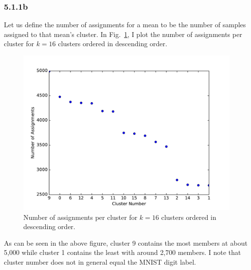 \documentclass[12pt]{amsart}
\begin{document}
\subsubsection*{5.1.1b}
Let us define the number of assignments for a mean to be the number of samples assigned to that mean's cluster.  In Fig.~\ref{fig:k_16_num_assignments}, I plot the number of assignments per cluster for $k = 16$ clusters ordered in descending order.
\begin{figure}[H]
	\includegraphics[width=\columnwidth]{k_16_num_assignments.pdf}
    \caption{Number of assignments per cluster for $k = 16$ clusters ordered in descending order.}
    \label{fig:k_16_num_assignments}
\end{figure}
As can be seen in the above figure, cluster 9 contains the most members at about 5,000 while cluster 1 contains the least with around 2,700 members.  I note that cluster number does not in general equal the MNIST digit label.
\end{document}
